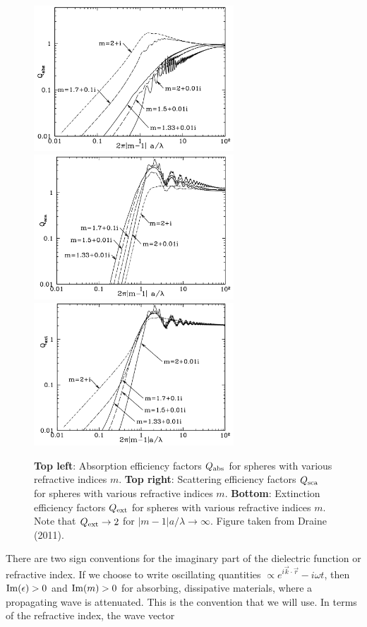 \documentclass[a4paper,10pt]{article}
\begin{document}
\begin{figure}[t!]
    \centering
    \includegraphics[width=7.5cm]{figures/Qabs.png}
    \includegraphics[width=7.5cm]{figures/Qsca.png}
    \includegraphics[width=7.5cm]{figures/Qext.png}
    \caption{\footnotesize{\textbf{Top left}: Absorption efficiency factors $Q_{\rm abs}$ for spheres with various refractive indices $m$. \textbf{Top right}: Scattering efficiency factors $Q_{\rm sca}$ for spheres with various refractive indices $m$. \textbf{Bottom}: Extinction efficiency factors $Q_{\rm ext}$ for spheres with various refractive indices $m$. Note that $Q_{\rm ext}\rightarrow2$ for $|m-1|a/\lambda\rightarrow\infty$. Figure taken from Draine (2011).}}
    \label{fig:Q}
\end{figure}

{\noindent}There are two sign conventions for the imaginary part of the dielectric function or refractive index. If we choose to write oscillating quantities $\propto e^{i\vec{k}\cdot\vec{r}}-i\omega t$, then ${\rm Im}(\epsilon)>0$ and ${\rm Im}(m)>0$ for absorbing, dissipative materials, where a propagating wave is attenuated. This is the convention that we will use. In terms of the refractive index, the wave vector
\end{document}
